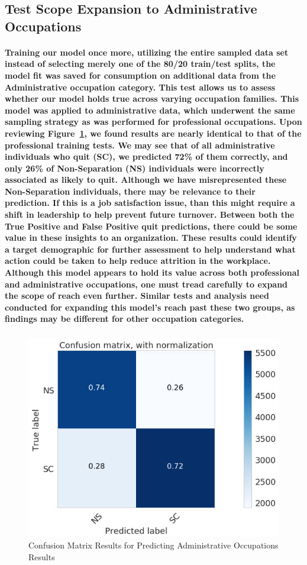 \documentclass[10pt]{article}
\begin{document}
\subsection{Test Scope Expansion to Administrative Occupations}

\paragraph{Training our model once more, utilizing the entire sampled data set instead of selecting merely one of the 80/20 train/test splits, the model fit was saved for consumption on additional data from the Administrative occupation category. This test allows us to assess whether our model holds true across varying occupation families. This model was applied to administrative data, which underwent the same sampling strategy as was performed for professional occupations. Upon reviewing Figure~\ref{fig:AdminLRConfus}, we found results are nearly identical to that of the professional training tests. We may see that of all administrative individuals who quit (SC), we predicted 72\% of them correctly, and only 26\% of Non-Separation (NS) individuals were incorrectly associated as likely to quit. Although we have misrepresented these Non-Separation individuals, there may be relevance to their prediction. If this is a job satisfaction issue, than this might require a shift in leadership to help prevent future turnover. Between both the True Positive and False Positive quit predictions, there could be some value in these insights to an organization. These results could identify a target demographic for further assessment to help understand what action could be taken to help reduce attrition in the workplace. Although this model appears to hold its value across both professional and administrative occupations, one must tread carefully to expand the scope of reach even further. Similar tests and analysis need conducted for expanding this model's reach past these two groups, as findings may be different for other occupation categories.}

\subparagraph{}
\begin{figure}[H]
\centering
\includegraphics[width=.8\linewidth]{AdminLRConfus.jpg}
\caption{Confusion Matrix Results for Predicting Administrative Occupations Results}
\label{fig:AdminLRConfus}
\end{figure}
\end{document}
